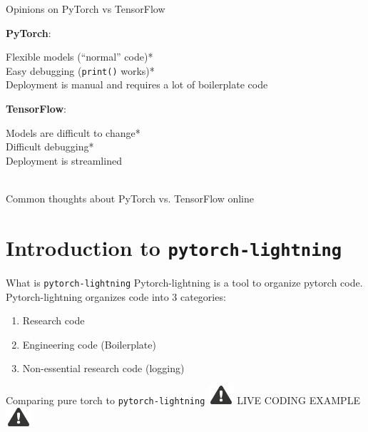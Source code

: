 \documentclass[aspectratio=169]{beamer}
\newcommand{\alertsymb}{\includegraphics[height=0.7cm]{alert.png}}
\newcommand{\livecode}{\Large \centering \alertsymb \hspace{1em}
	LIVE CODING EXAMPLE \hspace{1em} \alertsymb}
\begin{document}
	\begin{frame}{Opinions on PyTorch vs TensorFlow}
		\vfill
		\begin{minipage}[t]{0.45\textwidth}
			\textbf{PyTorch}:\\\small

			Flexible models (``normal'' code)*\\
			Easy debugging (\texttt{print()} works)*\\

			\alert<2>{Deployment is manual} and requires a lot of boilerplate code
		\end{minipage}\hfill
		\begin{minipage}[t]{0.45\textwidth}
			\textbf{TensorFlow}:\\\small

			Models are difficult to change*\\
			Difficult debugging*\\

			\alert<2>{Deployment is streamlined}
		\end{minipage}\\[5em]
		\centering \tiny *Common thoughts about PyTorch vs. TensorFlow online
	\end{frame}

	\section{Introduction to \texttt{pytorch-lightning}}

	\begin{frame}{What is \texttt{pytorch-lightning}}
		Pytorch-lightning is a tool to organize pytorch code.\\
		Pytorch-lightning organizes code into 3 categories:
		\begin{enumerate}
			\item Research code
			\item Engineering code (Boilerplate)
			\item Non-essential research code (logging)
		\end{enumerate}
	\end{frame}

	\begin{frame}{Comparing pure torch to \texttt{pytorch-lightning}}
		\livecode
	\end{frame}
\end{document}
